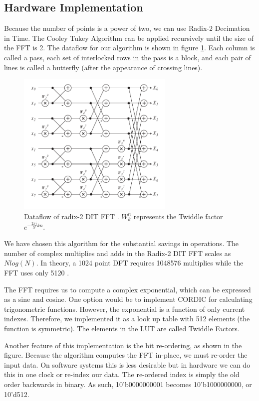 \documentclass[twoside]{article}
\begin{document}
  \subsection{Hardware Implementation}
  Because the number of points is a power of two, we can use Radix-2 Decimation in Time.
  The Cooley Tukey Algorithm can be applied recursively until the size of the FFT is 2.  
  The dataflow for our algorithm is shown in figure \ref{fig:butterfly}.  Each column
  is called a pass, each set of interlocked rows in the pass is a block, and each pair of lines is called a 
  butterfly (after the appearance of crossing lines).
  \begin{figure}[h]
  \includegraphics[width=75mm]{images/butterfly.pdf}
  \caption{Dataflow of radix-2 DIT FFT \cite{bib:butterfly}. $W_k^n$ represents the Twiddle factor $e^{-\frac{2\pi j}{N}kn}$.}  
  \label{fig:butterfly}
  \end{figure}
  
  We have chosen this algorithm for the substantial savings in operations. The number of complex multiplies and adds in
  the Radix-2 DIT FFT scales as $Nlog(N)$. In theory, a 1024 point DFT requires 1048576 multiplies while the FFT uses 
  only 5120 \cite{bib:fftdit}.
  
  The FFT requires us to compute a complex exponential, which can be expressed as a sine and cosine.  One option would be to 
  implement CORDIC for calculating trigonometric functions.  However, the exponential is a function of only current indexes.  
  Therefore, we implemented it as a look up table with 512 elements (the function is symmetric).  The elements in the LUT
  are called Twiddle Factors. 
  
  Another feature of this implementation is the bit re-ordering, as shown in the figure. Because the algorithm computes the
  FFT in-place, we must re-order the input data.  On software systems this is less desirable but in hardware we can do this
  in one clock or re-index our data.  The re-ordered index is simply the old order backwards in binary.  As such, 
  10'b0000000001 becomes 10'b1000000000, or 10'd512.
  
\end{document}

